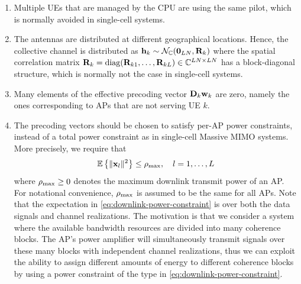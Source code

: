 \begin{enumerate}

\item Multiple UEs that are managed by the CPU are using the same pilot, which is normally avoided in single-cell systems.

\item The antennas are distributed at different geographical locations. Hence, the collective channel is distributed as $\mathbf{h}_k \sim \mathcal{N}_{\mathbb{C}}(\mathbf{0}_{LN}, \mathbf{R}_{k})$ where the spatial correlation matrix $\mathbf{R}_{k} = \mathrm{diag}(\mathbf{R}_{k1}, \ldots,   \mathbf{R}_{kL}) \in \mathbb{C}^{LN \times LN}$ has a block-diagonal structure, which is normally not the case in single-cell systems. 

\item Many elements of the effective precoding vector $\mathbf{D}_k\mathbf{w}_k$ are zero, namely the ones corresponding to APs that are not serving UE $k$.

\item The precoding vectors should be chosen to satisfy per-AP power constraints, instead of a total power constraint as in single-cell Massive MIMO systems. More precisely, we require that
\begin{equation} \label{eq:downlink-power-constraint}
\mathbb{E} \left\{ \| \mathbf{x}_l \|^2 \right\} \leq \rho_{\textrm{max}}, \quad l=1,\ldots,L
\end{equation}
where $\rho_{\textrm{max}} \geq 0$ denotes the maximum downlink transmit power of an AP. For notational convenience, $\rho_{\textrm{max}}$ is assumed to be the same for all APs. Note that the expectation in \eqref{eq:downlink-power-constraint} is over both the data signals and channel realizations. The motivation is that we consider a system where the available bandwidth resources are divided into many coherence blocks.  The AP's power amplifier will simultaneously transmit signals over these many blocks with independent channel realizations, thus we can exploit the ability to assign different amounts of energy to different coherence blocks by using a power constraint of the type in \eqref{eq:downlink-power-constraint}.
\end{enumerate}

